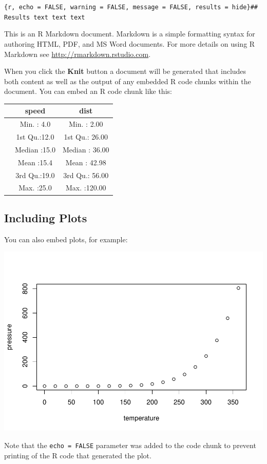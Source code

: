 \documentclass[]{article}
\begin{document}
\texttt{\{r,\ echo\ =\ FALSE,\ warning\ =\ FALSE,\ message\ =\ FALSE,\ results\ =\ \textquotesingle{}hide\textquotesingle{}\}\#\#\ Results\ text\ text\ text}

This is an R Markdown document. Markdown is a simple formatting syntax
for authoring HTML, PDF, and MS Word documents. For more details on
using R Markdown see \url{http://rmarkdown.rstudio.com}.

When you click the \textbf{Knit} button a document will be generated
that includes both content as well as the output of any embedded R code
chunks within the document. You can embed an R code chunk like this:

\begin{longtable}[]{@{}lcc@{}}
\toprule
& speed & dist\tabularnewline
\midrule
\endhead
& Min. : 4.0 & Min. : 2.00\tabularnewline
& 1st Qu.:12.0 & 1st Qu.: 26.00\tabularnewline
& Median :15.0 & Median : 36.00\tabularnewline
& Mean :15.4 & Mean : 42.98\tabularnewline
& 3rd Qu.:19.0 & 3rd Qu.: 56.00\tabularnewline
& Max. :25.0 & Max. :120.00\tabularnewline
\bottomrule
\end{longtable}

\subsection{Including Plots}\label{including-plots}

You can also embed plots, for example:

\includegraphics{FinalScript_files/figure-latex/pressure-1.pdf}

Note that the \texttt{echo\ =\ FALSE} parameter was added to the code
chunk to prevent printing of the R code that generated the plot.
\end{document}
